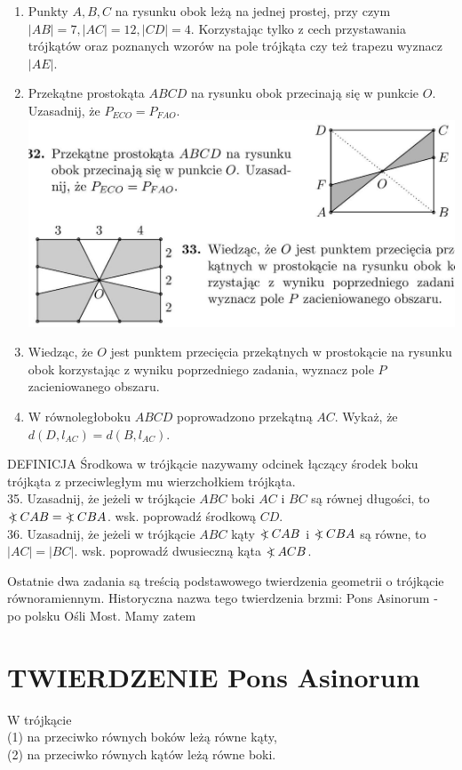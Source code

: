 \documentclass[10pt]{article}
\newcommand\Varangle{\mathop{{<\!\!\!\!\!\text{\small)}}\:}\nolimits}
\begin{document}
\begin{enumerate}
  \item Punkty \(A, B, C\) na rysunku obok leżą na jednej prostej, przy czym \(|A B|=7,|A C|=12,|C D|=4\). Korzystając tylko z cech przystawania trójkątów oraz poznanych wzorów na pole trójkąta czy też trapezu wyznacz \(|A E|\).
  \item Przekątne prostokąta \(A B C D\) na rysunku obok przecinają się w punkcie \(O\). Uzasadnij, że \(P_{E C O}=P_{F A O}\).\\
\includegraphics[max width=\textwidth, center]{2024_11_21_71f62bd117d375398909g-052(2)}
  \item Wiedząc, że \(O\) jest punktem przecięcia przekątnych w prostokącie na rysunku obok korzystając z wyniku poprzedniego zadania, wyznacz pole \(P\) zacieniowanego obszaru.
  \item W równoległoboku \(A B C D\) poprowadzono przekątną \(A C\). Wykaż, że \(d\left(D, l_{A C}\right)=d\left(B, l_{A C}\right)\).
\end{enumerate}

DEFINICJA Środkowa w trójkącie nazywamy odcinek łączący środek boku trójkąta z przeciwległym mu wierzchołkiem trójkąta.\\
35. Uzasadnij, że jeżeli w trójkącie \(A B C\) boki \(A C\) i \(B C\) są równej długości, to \(\Varangle C A B=\Varangle C B A\). wsk. poprowadź środkową \(C D\).\\
36. Uzasadnij, że jeżeli w trójkącie \(A B C\) kąty \(\Varangle C A B\) i \(\Varangle C B A\) są równe, to \(|A C|=|B C|\). wsk. poprowadź dwusieczną kąta \(\Varangle A C B\).

Ostatnie dwa zadania są treścią podstawowego twierdzenia geometrii o trójkącie równoramiennym. Historyczna nazwa tego twierdzenia brzmi: Pons Asinorum - po polsku Ośli Most. Mamy zatem

\section*{TWIERDZENIE Pons Asinorum}
W trójkącie\\
(1) na przeciwko równych boków leżą równe kąty,\\
(2) na przeciwko równych kątów leżą równe boki.
\end{document}
